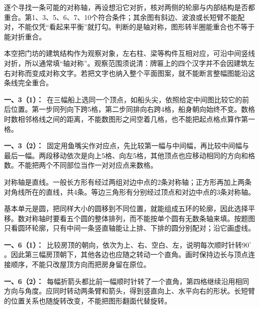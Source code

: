\documentclass[multi=snippet,border=0pt]{standalone}
\newenvironment{snippet}[3]{\begin{minipage}{#1bp}\color{answerred}\fontsize{#2}{#3}\selectfont\raggedright}{\end{minipage}}
\begin{document}
\begin{snippet}{505}{11.5}{14}逐个寻找一条可能的对称轴，再设想沿它对折，核对两侧的轮廓与内部结构是否都重合。第1、3、5、6、7、10个符合条件；其余图有斜边、波浪或长短臂不能配对，不能仅凭“看起来平衡”就打勾。判断的是轴对称，图形转半圈能重合也不等于能对折重合。\end{snippet}
\begin{snippet}{505}{11.5}{14}本空把门坊的建筑结构作为观察对象，左右柱、梁等构件互相对应，可沿中间竖线对折，所以通常填“轴对称”。观察范围须说清：牌匾上的四个汉字并不会因建筑左右对称而变成对称文字。若把文字也纳入整个平面图案，就不能断言整幅图能沿这条线完全重合。\end{snippet}
\begin{snippet}{505}{11.5}{14}\textbf{一、3（1）：}\ 在三幅船上选同一个顶点，如船头尖，依照给定中间图比较它的前后位置。第一步同列向下跨5格，第二步同排向右跨4格，船身朝向始终不变。数格时数相邻格线之间的距离，不能数图形之间空着几格，也不能把起点格点算作第一格。\end{snippet}
\begin{snippet}{505}{11.5}{14}\textbf{一、3（2）：}\ 固定用鱼嘴尖作对应点，先比较第一幅与中间幅，再比较中间幅与最后一幅。两段移动依次是向上5格、向左5格，其他顶点也应移动相同的方向和格数。不能把两个不同部位当作一对对应点来数格。\end{snippet}
\begin{snippet}{505}{11.5}{14}对称轴是直线。一般长方形有经过两组对边中点的2条对称轴；正方形再加上两条对角线所在的直线，共4条。等边三角形有分别经过顶点和对边中点的3条对称轴。\end{snippet}
\begin{snippet}{505}{11.5}{14}基本单元是圆，把同样大小的圆移到不同位置，就能组成五环的轮廓，因此选择平移。数对称轴时要看五个圆的整体排列，而不能按单个圆有无数条轴来填。按题图只看圆环轮廓，只有中间一条竖直轴能让上排、下排的圆分别配对；沿它画虚线。\end{snippet}
\begin{snippet}{505}{11.5}{14}\textbf{一、6（1）：}\ 比较房顶的朝向，依次为上、右、空白、左，说明每次顺时针转\(90^\circ\)。因此第三幅房顶朝下，其他各边也应随之转动一个直角。画时保持边长与顶点连接顺序，不能只改屋顶方向而把房身留在原位。\end{snippet}
\begin{snippet}{505}{11.5}{14}\textbf{一、6（2）：}\ 每幅折箭头都比前一幅顺时针转了一个直角，第四格继续沿用相同方向与角度。应同时转动两条臂和箭头，得到竖直向上、水平向右的形状。长短臂的位置关系也随旋转改变，不能把图形翻面代替旋转。\end{snippet}
\end{document}

